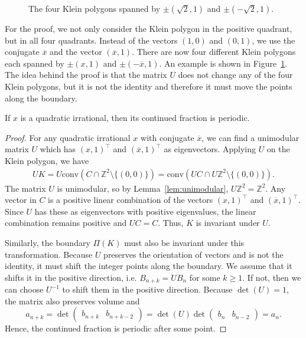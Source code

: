 \begin{figure}[tb]
  \centering
  
  \caption{
    The four Klein polygons spanned by $±(\sqrt{2}, 1)$ and $±(-\sqrt{2}, 1)$.
  }
  \label{fig:full-klein-polygon}
\end{figure}

For the proof, we not only consider the Klein polygon in the positive quadrant,
but in all four quadrants.
Instead of the vectors $(1, 0)$ and $(0, 1)$, we use the conjugate
$\overline{x}$ and the vector $(\overline{x}, 1)$.
There are now four different Klein polygons each spanned by $±(x, 1)$
and $±(-\overline{x}, 1)$.
An example is shown in Figure~\ref{fig:full-klein-polygon}.
The idea behind the proof is that the matrix $U$ does not change any of the four
Klein polygons, but it is not the identity and therefore it must move the
points along the boundary.

\begin{theorem}
  If $x$ is a quadratic irrational,
  then its continued fraction is periodic.
\end{theorem}

\begin{proof}
  For any quadratic irrational $x$ with conjugate $\overline{x}$, we can find a
  unimodular matrix $U$ which has $(x, 1)^⊤$ and $(\overline{x}, 1)^⊤$ as eigenvectors.
  Applying $U$ on the Klein polygon, we have
  \begin{align*}
    UK
    = U \mathrm{conv}(C ∩ ℤ^2 \setminus \{(0, 0)\})
    = \mathrm{conv}(UC ∩ Uℤ^2 \setminus \{(0, 0)\}).
  \end{align*}
  The matrix $U$ is unimodular, so by Lemma~\ref{lem:unimodular}, $Uℤ^2 = ℤ^2$.
  Any vector in $C$ is a positive linear combination of the vectors $(x, 1)^⊤$ and $(\overline x, 1)^⊤$.
  Since $U$ has these as eigenvectors with positive eigenvalues,
  the linear combination remains positive and $UC = C$.
  Thus, $K$ is invariant under $U$.

  Similarly, the boundary $Π(K)$ must also be invariant under this transformation.
  Because $U$ preserves the orientation of vectors and is not the identity, it
  must shift the integer points along the boundary.
  We assume that it shifts it in the positive direction,
  i.e. $B_{n+k} = U B_n$ for some $k ≥ 1$.
  If not, then we can choose $U^{-1}$ to shift them in the positive direction.
  Because $\det(U) = 1$, the matrix also preserves volume and
  \[
    a_{n+k}
    = \det\begin{pmatrix}
      b_{n+k} & b_{n+k-2}
    \end{pmatrix}
    = \det(U) \det\begin{pmatrix}
      b_n & b_{n-2}
    \end{pmatrix}
    = a_n.
  \]
  Hence, the continued fraction is periodic after some point.
\end{proof}

